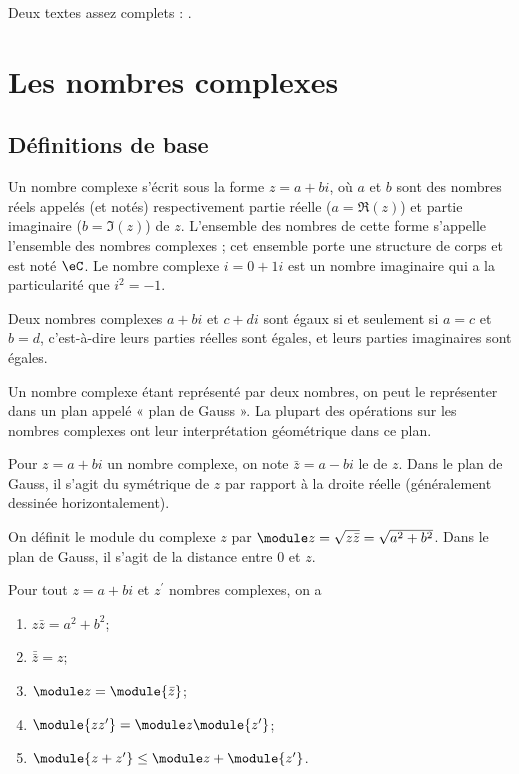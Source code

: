 
Deux textes assez complets : \cite{MesIntProbb,MathAgreg}.

 \section{Les nombres complexes}
 \subsection{Définitions de base}
 Un nombre complexe s'écrit sous la forme $z = a + b i$, où $a$ et $b$
 sont des nombres réels appelés (et notés) respectivement partie réelle
 ($a = \Re(z)$) et partie imaginaire ($b = \Im(z)$) de $z$. L'ensemble
 des nombres de cette forme s'appelle l'ensemble des nombres complexes
 ; cet ensemble porte une structure de corps et est noté $\eC$. Le
 nombre complexe $i = 0 + 1 i$ est un nombre imaginaire qui a la
 particularité que $i^2 = -1$.

 Deux nombres complexes $a + bi$ et $c + di$ sont égaux si et seulement
 si $a = c$ et $b = d$, c'est-à-dire leurs parties réelles sont égales,
 et leurs parties imaginaires sont égales.

 Un nombre complexe étant représenté par deux nombres, on peut le
 représenter dans un plan appelé « plan de Gauss ». La plupart des
 opérations sur les nombres complexes ont leur interprétation
 géométrique dans ce plan.

 Pour $z = a + bi$ un nombre complexe, on note $\bar z = a - bi$ le
  de $z$. Dans le plan de Gauss, il s'agit du
 symétrique de $z$ par rapport à la droite réelle (généralement
 dessinée horizontalement).

 On définit le module du complexe $z$ par $\module z = \sqrt{z\bar z} =
 \sqrt{a^2 + b^2}$. Dans le plan de Gauss, il s'agit de la distance
 entre $0$ et $z$.

 \begin{proposition}
Pour tout $z = a+bi$ et $z^\prime$ nombres complexes, on a
   \begin{enumerate}
   \item $z \bar z = a^2 + b^2$;
   \item $\bar{\bar{z}} = z$;
   \item $\module z = \module {\bar z}$;
   \item $\module{zz^\prime} = \module z \module{z^\prime}$;
   \item $\module{z+z^\prime} \leq \module z + \module{z^\prime}$.
   \end{enumerate}
 \end{proposition}

